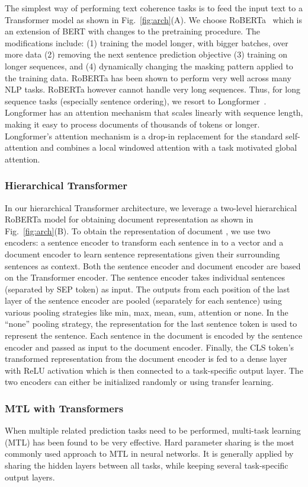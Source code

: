 \documentclass[11pt]{article}
\begin{document}
The simplest way of performing text coherence tasks is to feed the input text to a Transformer model as shown in Fig.~\ref{fig:arch}(A). We choose RoBERTa~\cite{liu2019roberta} which is an extension of BERT with changes to the pretraining procedure. The modifications include: (1) training the model longer, with bigger batches, over more data (2) removing the next sentence prediction objective (3) training on longer sequences, and (4) dynamically changing the masking pattern applied to the training data. RoBERTa has been shown to perform very well across many NLP tasks. RoBERTa however cannot handle very long sequences. Thus, for long sequence tasks (especially sentence ordering), we resort to Longformer~\cite{beltagy2020longformer}. Longformer has an attention mechanism that scales linearly with sequence length, making it easy to process documents of thousands of tokens or longer. Longformer's attention mechanism is a drop-in replacement for the standard self-attention and combines a local windowed attention with a task motivated global attention. 

\subsubsection{Hierarchical Transformer}
In our hierarchical Transformer architecture, we leverage a two-level hierarchical RoBERTa model for obtaining document representation as shown in Fig.~\ref{fig:arch}(B). To obtain the representation of document , we use two encoders: a sentence encoder to transform each sentence in  to a vector and a document encoder to learn sentence representations given their surrounding sentences as context. Both the sentence encoder and document encoder are based on the Transformer encoder. The sentence encoder takes individual sentences (separated by SEP token) as input. The outputs from each position of the last layer of the sentence encoder are pooled (separately for each sentence) using various pooling strategies like min, max, mean, sum, attention or none. In the ``none'' pooling strategy, the representation for the last sentence token is used to represent the sentence. Each sentence in the document is encoded by the sentence encoder and passed as input to the document encoder. Finally, the CLS token's transformed representation from the document encoder is fed to a dense layer with ReLU activation which is then connected to a task-specific output layer. The two encoders can either be initialized randomly or using transfer learning. 

\subsubsection{MTL with Transformers}
When multiple related prediction tasks need to be performed, multi-task learning (MTL) has been found to be very effective. Hard parameter sharing is the most commonly used approach to MTL in neural networks. It is generally applied by sharing the hidden layers between all tasks, while keeping several task-specific output layers. 
\end{document}
